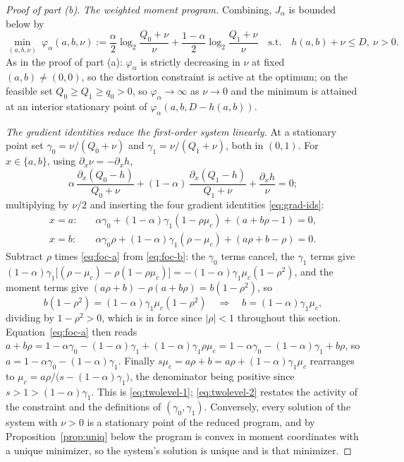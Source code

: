 \documentclass[11pt,onecolumn]{IEEEtran}
\begin{document}
\begin{proof}[Proof of part (b)]
\emph{The weighted moment program.} Combining, $J_\alpha$ is bounded
below by
\begin{equation}
\min_{(a,b,\nu)}\ \varphi_\alpha(a,b,\nu):=
\frac\alpha2\log_2\frac{Q_0+\nu}{\nu}
+\frac{1-\alpha}2\log_2\frac{Q_1+\nu}{\nu}
\quad\text{s.t.}\quad h(a,b)+\nu\le D,\ \nu>0 .
\label{eq:weighted-program}
\end{equation}
As in the proof of part (a): $\varphi_\alpha$ is strictly
decreasing in $\nu$ at fixed $(a,b)\ne(0,0)$, so the distortion
constraint is active at the optimum; on the feasible set
$Q_0\ge Q_1\ge q_0>0$, so $\varphi_\alpha\to\infty$ as $\nu\to0$ and the
minimum is attained at an interior stationary point of
$\varphi_\alpha(a,b,D-h(a,b))$.

\emph{The gradient identities reduce the first-order system linearly.}
At a stationary point set $\gamma_0=\nu/(Q_0+\nu)$ and
$\gamma_1=\nu/(Q_1+\nu)$, both in $(0,1)$. For $x\in\{a,b\}$, using
$\partial_x\nu=-\partial_xh$,
\[
\alpha\,\frac{\partial_x(Q_0-h)}{Q_0+\nu}
+(1-\alpha)\,\frac{\partial_x(Q_1-h)}{Q_1+\nu}
+\frac{\partial_xh}{\nu}=0 ;
\]
multiplying by $\nu/2$ and inserting the four gradient identities
\eqref{eq:grad-ids}:
\begin{align}
x=a:&\quad
\alpha\gamma_0+(1-\alpha)\gamma_1(1-\rho\mu_c)+(a+b\rho-1)=0,
\label{eq:foc-a}\\
x=b:&\quad
\alpha\gamma_0\rho+(1-\alpha)\gamma_1(\rho-\mu_c)+(a\rho+b-\rho)=0 .
\label{eq:foc-b}
\end{align}
Subtract $\rho$ times \eqref{eq:foc-a} from \eqref{eq:foc-b}: the
$\gamma_0$ terms cancel, the $\gamma_1$ terms give
$(1-\alpha)\gamma_1\bigl[(\rho-\mu_c)-\rho(1-\rho\mu_c)\bigr]
=-(1-\alpha)\gamma_1\mu_c(1-\rho^2)$, and the moment terms give
$(a\rho+b)-\rho(a+b\rho)=b(1-\rho^2)$, so
\[
b(1-\rho^2)=(1-\alpha)\gamma_1\mu_c(1-\rho^2)
\quad\Longrightarrow\quad
b=(1-\alpha)\gamma_1\mu_c ,
\]
dividing by $1-\rho^2>0$, which is in force since $|\rho|<1$
throughout this section.
Equation~\eqref{eq:foc-a} then reads
$a+b\rho=1-\alpha\gamma_0-(1-\alpha)\gamma_1+(1-\alpha)\gamma_1\rho\mu_c
=1-\alpha\gamma_0-(1-\alpha)\gamma_1+b\rho$, so
$a=1-\alpha\gamma_0-(1-\alpha)\gamma_1$. Finally
$s\mu_c=a\rho+b=a\rho+(1-\alpha)\gamma_1\mu_c$ rearranges to
$\mu_c=a\rho/\bigl(s-(1-\alpha)\gamma_1\bigr)$, the denominator being
positive since $s>1>(1-\alpha)\gamma_1$. This is
\eqref{eq:twolevel-1}; \eqref{eq:twolevel-2} restates the activity of
the constraint and the definitions of $(\gamma_0,\gamma_1)$.
Conversely, every solution of the system with $\nu>0$ is a stationary
point of the reduced program, and by Proposition~\ref{prop:uniq} below
the program is convex in moment coordinates with a unique minimizer, so
the system's solution is unique and is that minimizer.


\end{proof}
\end{document}
